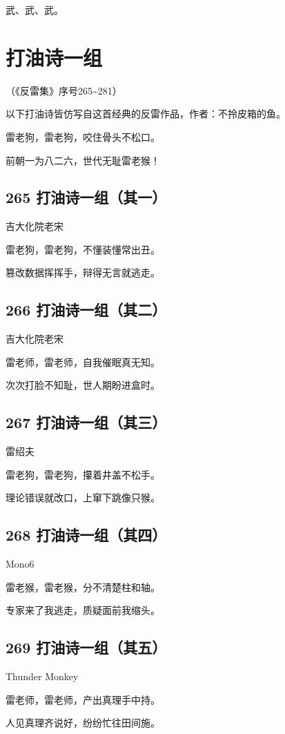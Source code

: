 \documentclass[UTF8,12pt,oneside]{ctexbook}
\def\pau#1{\begin{center} {#1} \end{center}} %
\def\poem#1#2{\section{#1}\pau{#2}} %
\def\lidend{\setlength\parindent{2em}}
\begin{document}
        武、武、武。
        \lidend

        \newpage

        \chapter{打油诗一组}
        \begin{center}
            （《反雷集》序号265\textasciitilde281）
        \end{center}

        \kaishu
        以下打油诗皆仿写自这首经典的反雷作品，作者：不拎皮箱的鱼。

        \songti
        \begin{center}
            雷老狗，雷老狗，咬住骨头不松口。
            
            前朝一为八二六，世代无耻雷老猴！
        \end{center}

        \poem{265 打油诗一组（其一）}{吉大化院老宋}
        \begin{center}
            雷老狗，雷老狗，不懂装懂常出丑。
        
            篡改数据挥挥手，辩得无言就逃走。
        \end{center}

        \poem{266 打油诗一组（其二）}{吉大化院老宋}
        \begin{center}
            雷老师，雷老师，自我催眠真无知。

            次次打脸不知耻，世人期盼进盒时。
        \end{center}

        \poem{267 打油诗一组（其三）}{雷绍夫}
        \begin{center}
            雷老狗，雷老狗，攥着井盖不松手。

            理论错误就改口，上窜下跳像只猴。
        \end{center}

        \poem{268 打油诗一组（其四）}{Mono6}
        \begin{center}
            雷老猴，雷老猴，分不清楚柱和轴。
            
            专家来了我逃走，质疑面前我缩头。
        \end{center}

        \poem{269 打油诗一组（其五）}{Thunder Monkey}
        \begin{center}
            雷老师，雷老师，产出真理手中持。

            人见真理齐说好，纷纷忙往田间施。
        \end{center}
\end{document}
